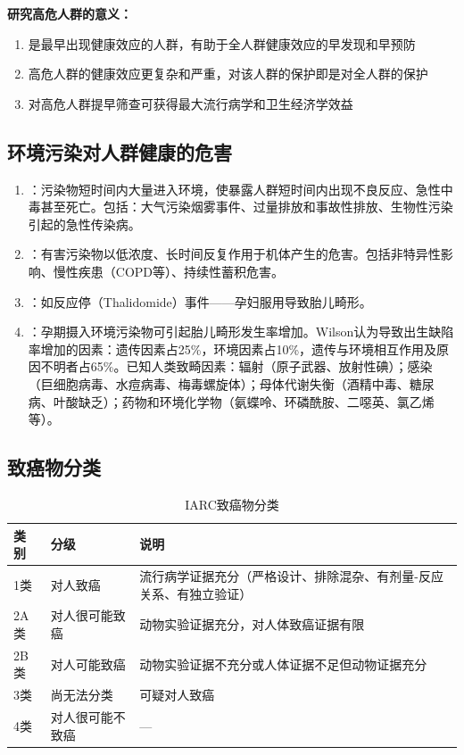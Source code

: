 \begin{tipbox}
\textbf{研究高危人群的意义：}
\begin{enumerate}[leftmargin=*]
    \item 是最早出现健康效应的人群，有助于全人群健康效应的早发现和早预防
    \item 高危人群的健康效应更复杂和严重，对该人群的保护即是对全人群的保护
    \item 对高危人群提早筛查可获得最大流行病学和卫生经济学效益
\end{enumerate}
\end{tipbox}

\subsection{环境污染对人群健康的危害}

\begin{enumerate}[leftmargin=*]
    \item {}：污染物短时间内大量进入环境，使暴露人群短时间内出现不良反应、急性中毒甚至死亡。包括：大气污染烟雾事件、过量排放和事故性排放、生物性污染引起的急性传染病。
    \item {}：有害污染物以低浓度、长时间反复作用于机体产生的危害。包括非特异性影响、慢性疾患（COPD等）、持续性蓄积危害。
    \item {}：如反应停（Thalidomide）事件——孕妇服用导致胎儿畸形。
    \item {}：孕期摄入环境污染物可引起胎儿畸形发生率增加。Wilson认为导致出生缺陷率增加的因素：遗传因素占25\%，环境因素占10\%，遗传与环境相互作用及原因不明者占65\%。已知人类致畸因素：辐射（原子武器、放射性碘）；感染（巨细胞病毒、水痘病毒、梅毒螺旋体）；母体代谢失衡（酒精中毒、糖尿病、叶酸缺乏）；药物和环境化学物（氨蝶呤、环磷酰胺、二噁英、氯乙烯等）。
\end{enumerate}

\subsection{致癌物分类}

\begin{table}[htbp]
\centering
\caption{IARC致癌物分类}
\begin{tabularx}{\textwidth}{llX}
\hline
\textbf{类别} & \textbf{分级} & \textbf{说明} \\
\hline
1类 & 对人致癌 & 流行病学证据充分（严格设计、排除混杂、有剂量-反应关系、有独立验证）\\
2A类 & 对人很可能致癌 & 动物实验证据充分，对人体致癌证据有限 \\
2B类 & 对人可能致癌 & 动物实验证据不充分或人体证据不足但动物证据充分 \\
3类 & 尚无法分类 & 可疑对人致癌 \\
4类 & 对人很可能不致癌 & — \\
\hline
\end{tabularx}
\end{table}

